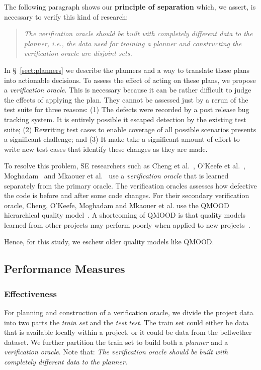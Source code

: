 \documentclass[sigconf, proceedings, 9pt]{acmart}
\newcommand{\tion}[1]{\S~\ref{sect:#1}}
\begin{document}
The following paragraph shows our {\bf principle of separation} which, we 
assert, is necessary to verify this kind of research: 
\begin{quote}
	{\em The verification oracle should be built with completely different data to 
	the planner, i.e., the data used for training a planner and constructing the 
	verification oracle are disjoint sets.}
\end{quote}


In \tion{planners} we describe the planners and a way to translate these plans 
into actionable decisions. To assess the effect of acting on these plans, we 
propose a  \textit{verification oracle}. This is necessary because it can be 
rather difficult  to judge the  effects of applying the plan. They cannot be 
assessed just by a rerun of the test
suite for three reasons: (1) The defects were recorded by a post release bug 
tracking system. It is entirely possible it escaped detection by the existing 
test suite; (2) Rewriting test cases to enable coverage of all possible 
scenarios presents a significant challenge; and (3) It make take a significant 
amount of effort to write new test cases that 
identify these changes as they are made.

To resolve this problem, SE researchers such as
Cheng et al.~\cite{Cheng10}, O'Keefe et al.~\cite{OKeeffe08,OKeeffe07},
Moghadam~\cite{Moghadam2011} and Mkaouer et al.~\cite{Mkaouer14}
use a {\em verification oracle} that is learned separately
from the primary oracle. The verification oracles assesses
how defective the code is before and after some
code changes.
For their secondary verification oracle,
Cheng, O'Keefe, Moghadam and  Mkaouer et al. use the QMOOD hierarchical
quality model~\cite{Bansiya02}.
A shortcoming of QMOOD
is that quality models learned from other projects
may perform poorly when applied to new projects~\cite{localvsglobal}.

Hence, for this study, we  eschew
older quality models like QMOOD.

\subsection{Performance Measures}
\label{sect:evaluation}

\subsubsection{Effectiveness}
\label{sect:effectiveness}
For planning and construction of a verification oracle, we divide the
project data into two parts the \textit{train set} and the \textit{test test}.
The train set could either be data that is available locally within a project, 
or it could be data from the bellwether dataset. We further partition the train 
set to build both a {\em planner} and a {\em verification oracle}. Note that: 
{\em The verification oracle should be built with completely different data to 
the planner.}
\end{document}
